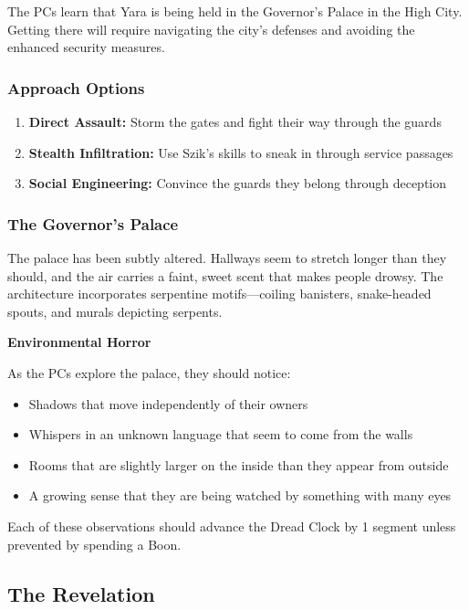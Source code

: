 \documentclass[12pt,twoside]{article}
\newenvironment{adventurebox}[1]{
  \begin{mdframed}[
    linewidth=2pt,
    linecolor=serpentgreen,
    backgroundcolor=gray!10,
    innertopmargin=10pt,
    innerbottommargin=10pt,
    innerrightmargin=10pt,
    innerleftmargin=10pt
  ]
  \textbf{#1}
}{\end{mdframed}}
\begin{document}
The PCs learn that Yara is being held in the Governor's Palace in the High City. Getting there will require navigating the city's defenses and avoiding the enhanced security measures.

\subsubsection{Approach Options}

\begin{enumerate}
  \item \textbf{Direct Assault:} Storm the gates and fight their way through the guards
  \item \textbf{Stealth Infiltration:} Use Szik's skills to sneak in through service passages
  \item \textbf{Social Engineering:} Convince the guards they belong through deception
\end{enumerate}

\subsubsection{The Governor's Palace}

The palace has been subtly altered. Hallways seem to stretch longer than they should, and the air carries a faint, sweet scent that makes people drowsy. The architecture incorporates serpentine motifs—coiling banisters, snake-headed spouts, and murals depicting serpents.

\begin{adventurebox}{Environmental Horror}
As the PCs explore the palace, they should notice:
\begin{itemize}
  \item Shadows that move independently of their owners
  \item Whispers in an unknown language that seem to come from the walls
  \item Rooms that are slightly larger on the inside than they appear from outside
  \item A growing sense that they are being watched by something with many eyes
\end{itemize}
Each of these observations should advance the Dread Clock by 1 segment unless prevented by spending a Boon.
\end{adventurebox}

\subsection{The Revelation}
\end{document}
